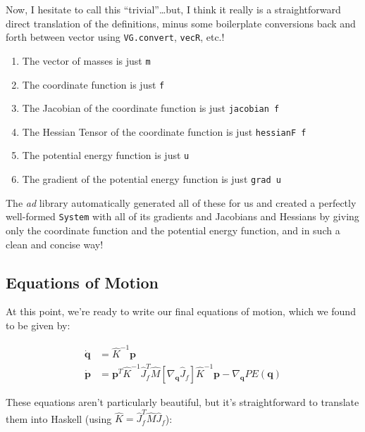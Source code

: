 \documentclass[]{article}
\begin{document}
Now, I hesitate to call this ``trivial''\ldots but, I think it really is a
straightforward direct translation of the definitions, minus some boilerplate
conversions back and forth between vector using \texttt{VG.convert},
\texttt{vecR}, etc.!

\begin{enumerate}
\def\labelenumi{\arabic{enumi}.}
\tightlist
\item
  The vector of masses is just \texttt{m}
\item
  The coordinate function is just \texttt{f}
\item
  The Jacobian of the coordinate function is just \texttt{jacobian\ f}
\item
  The Hessian Tensor of the coordinate function is just \texttt{hessianF\ f}
\item
  The potential energy function is just \texttt{u}
\item
  The gradient of the potential energy function is just \texttt{grad\ u}
\end{enumerate}

The \emph{ad} library automatically generated all of these for us and created a
perfectly well-formed \texttt{System} with all of its gradients and Jacobians
and Hessians by giving only the coordinate function and the potential energy
function, and in such a clean and concise way!

\hypertarget{equations-of-motion}{%
\subsection{Equations of Motion}\label{equations-of-motion}}

At this point, we're ready to write our final equations of motion, which we
found to be given by:

\[
\begin{aligned}
\dot{\mathbf{q}} & = \hat{K}^{-1} \mathbf{p} \\
\dot{\mathbf{p}} & = \mathbf{p}^T \hat{K}^{-1} \hat{J}_f^T \hat{M}
        \left[ \nabla_{\mathbf{q}} \hat{J}_f \right] \hat{K}^{-1} \mathbf{p}
    - \nabla_{\mathbf{q}} PE(\mathbf{q})
\end{aligned}
\]

These equations aren't particularly beautiful, but it's straightforward to
translate them into Haskell (using \(\hat{K} = \hat{J}_f^T \hat{M} \hat{J}_f\)):
\end{document}
